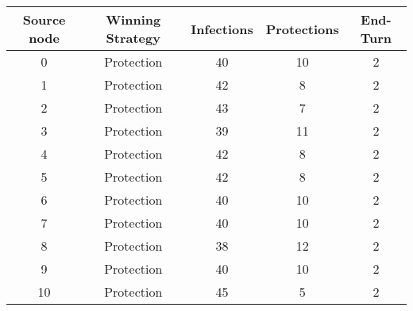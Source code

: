 \documentclass[results.tex]{subfiles}
\begin{document}
    \begin{center}
        \begin{tabular}{| c || c | c | c | c |}
            \hline
            {\bfseries Source node} & {\bfseries Winning Strategy} & {\bfseries Infections} & {\bfseries Protections}
            & {\bfseries End-Turn}
            \\  %
            \hline\hline
            0                       & Protection                   & 40                     & 10                      & 2                    \\
            \hline
            1                       & Protection                   & 42                     & 8                       & 2                    \\
            \hline
            2                       & Protection                   & 43                     & 7                       & 2                    \\
            \hline
            3                       & Protection                   & 39                     & 11                      & 2                    \\
            \hline
            4                       & Protection                   & 42                     & 8                       & 2                    \\
            \hline
            5                       & Protection                   & 42                     & 8                       & 2                    \\
            \hline
            6                       & Protection                   & 40                     & 10                      & 2                    \\
            \hline
            7                       & Protection                   & 40                     & 10                      & 2                    \\
            \hline
            8                       & Protection                   & 38                     & 12                      & 2                    \\
            \hline
            9                       & Protection                   & 40                     & 10                      & 2                    \\
            \hline
            10                      & Protection                   & 45                     & 5                       & 2                    \\

\end{tabular}
\end{center}
\end{document}
